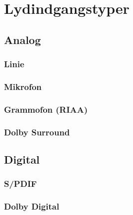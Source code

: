 \section{Lydindgangstyper}
\label{indgange}
\subsection{Analog}

\subsubsection{Linie}
\subsubsection{Mikrofon}
\subsubsection{Grammofon (RIAA)}
\subsubsection{Dolby Surround}

\subsection{Digital}
\subsubsection{S/PDIF}
\subsubsection{Dolby Digital}
